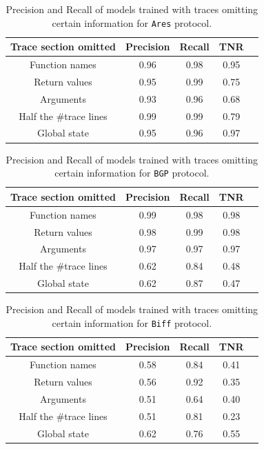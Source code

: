 \begin{table}[]
\centering
\begin{tabular}{|c|c|c|c|c|}
	\hline
	Trace section omitted   & {Precision} & {Recall} & TNR\\ 
	\hline \hline
	Function names  & 0.96 & 0.98 & 0.95 \\ \hline 
	Return values & 0.95  & 0.99 & 0.75 \\ \hline
	Arguments & 0.93  & 0.96 & 0.68 \\ \hline
	Half the \#trace lines & 0.99 & 0.99 & 0.79 \\ \hline
	Global state & 0.95 & 0.96 & 0.97 \\ \hline 
\end{tabular}
\caption{Precision and Recall of models trained with traces omitting certain information for \texttt{Ares} protocol. }
\label{tab:ares_removed_trace}
\end{table}


\begin{table}[]
\centering
\begin{tabular}{|c|c|c|c|c|}
	\hline
	Trace section omitted   & {Precision} & {Recall} & TNR\\ 
	\hline \hline
	Function names  & 0.99 & 0.98 & 0.98 \\ \hline 
	Return values & 0.98 & 0.99 & 0.98 \\ \hline
	Arguments & 0.97  & 0.97 & 0.97 \\ \hline
	Half the \#trace lines & 0.62 & 0.84 & 0.48 \\ \hline
	Global state & 0.62 & 0.87 & 0.47 \\ \hline
\end{tabular}
\caption{Precision and Recall of models trained with traces omitting certain information for \texttt{BGP} protocol. }
\label{tab:bgp_removed_trace}
\end{table}



\begin{table}[]
\centering
\begin{tabular}{|c|c|c|c|c|}
	\hline
	Trace section omitted   & {Precision} & {Recall} & TNR\\ 
	\hline \hline
	Function names  & 0.58 & 0.84 & 0.41 \\ \hline 
	Return values & 0.56 & 0.92 & 0.35 \\ \hline
	Arguments & 0.51  & 0.64 & 0.40 \\ \hline
	Half the \#trace lines & 0.51 & 0.81 & 0.23 \\ \hline
	Global state & 0.62 & 0.76 & 0.55 \\ \hline
\end{tabular}
\caption{Precision and Recall of models trained with traces omitting certain information for \texttt{Biff} protocol. }
\label{tab:biff_removed_trace}
\end{table}


